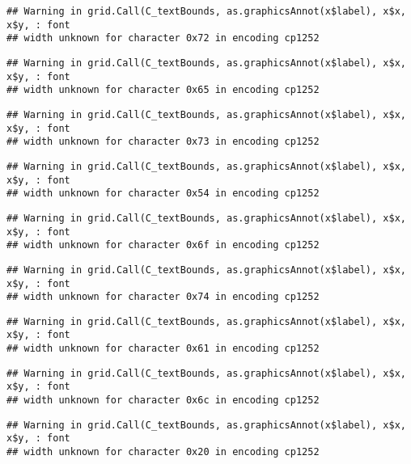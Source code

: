 \documentclass[
]{article}
\begin{document}
\begin{verbatim}
## Warning in grid.Call(C_textBounds, as.graphicsAnnot(x$label), x$x, x$y, : font
## width unknown for character 0x72 in encoding cp1252
\end{verbatim}

\begin{verbatim}
## Warning in grid.Call(C_textBounds, as.graphicsAnnot(x$label), x$x, x$y, : font
## width unknown for character 0x65 in encoding cp1252
\end{verbatim}

\begin{verbatim}
## Warning in grid.Call(C_textBounds, as.graphicsAnnot(x$label), x$x, x$y, : font
## width unknown for character 0x73 in encoding cp1252
\end{verbatim}

\begin{verbatim}
## Warning in grid.Call(C_textBounds, as.graphicsAnnot(x$label), x$x, x$y, : font
## width unknown for character 0x54 in encoding cp1252
\end{verbatim}

\begin{verbatim}
## Warning in grid.Call(C_textBounds, as.graphicsAnnot(x$label), x$x, x$y, : font
## width unknown for character 0x6f in encoding cp1252
\end{verbatim}

\begin{verbatim}
## Warning in grid.Call(C_textBounds, as.graphicsAnnot(x$label), x$x, x$y, : font
## width unknown for character 0x74 in encoding cp1252
\end{verbatim}

\begin{verbatim}
## Warning in grid.Call(C_textBounds, as.graphicsAnnot(x$label), x$x, x$y, : font
## width unknown for character 0x61 in encoding cp1252
\end{verbatim}

\begin{verbatim}
## Warning in grid.Call(C_textBounds, as.graphicsAnnot(x$label), x$x, x$y, : font
## width unknown for character 0x6c in encoding cp1252
\end{verbatim}

\begin{verbatim}
## Warning in grid.Call(C_textBounds, as.graphicsAnnot(x$label), x$x, x$y, : font
## width unknown for character 0x20 in encoding cp1252
\end{verbatim}
\end{document}
